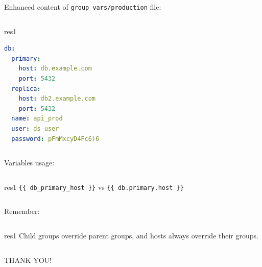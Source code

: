 \documentclass[pdf, 8pt, unicode, t]{beamer} %
\newcommand{\bluetext}[1]{{\usebeamercolor[fg]{bluetext_color}#1}}
\begin{document}
\begin{frame}[fragile]

Enhanced content of \verb|group_vars/production| file:\\
\vspace{1em}
\begin{columns}[t]
\begin{beamercolorbox}[dp=1ex,wd=\textwidth,sep=-0.5em,rounded=true,shadow=true,center]{res1}
\begin{lstlisting}[language=yaml]
db:
  primary:
    host: db.example.com
    port: 5432
  replica:
    host: db2.example.com
    port: 5432
  name: api_prod
  user: ds_user
  password: pFmMxcyD4Fc6)6
\end{lstlisting}
\end{beamercolorbox}
\end{columns}
\vspace{1em}

Variables usage:
\begin{columns}[t]
\begin{beamercolorbox}[dp=1ex,wd=\textwidth,sep=0.0em,rounded=true,shadow=true,center]{res1}
\verb|{{ db_primary_host }}| vs \verb|{{ db.primary.host }}|
\end{beamercolorbox}
\end{columns}
\vspace{2em}

Remember:
\vspace{1em}
\begin{columns}[t]
\begin{beamercolorbox}[dp=1ex,wd=\textwidth,sep=0.0em,rounded=true,shadow=true,center]{res1}
\alert{Child groups override parent groups, and hosts always override their groups.}
\end{beamercolorbox}
\end{columns}



\end{frame}


\begin{frame}[plain,c,label=thanks]
\begin{center}
\textrm{\bluetext{\Large THANK YOU!}}
\end{center}
\end{frame}
\end{document}
